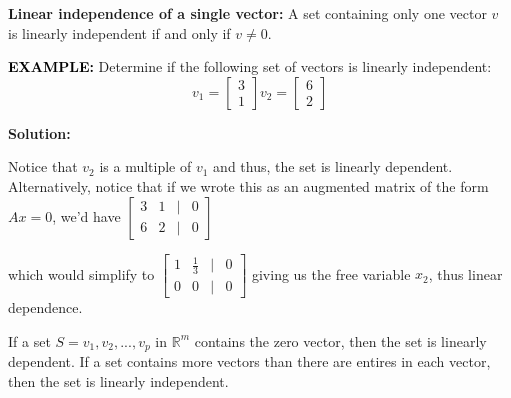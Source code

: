 \documentclass[12pt]{article}
\newcommand{\solution}{\noindent\textbf{Solution:}\par\nopagebreak}
\newcommand{\example}[1]{\noindent\textcolor{black}{\textbf{EXAMPLE:}} #1 \par}
\newcommand{\definition}[2]{
  \noindent\textbf{#1:} #2
}
\begin{document}
\definition{Linear independence of a single vector}{
    A set containing only one vector $v$ is linearly independent if and only if $v \neq 0$.
}

\example{
    Determine if the following set of vectors is linearly independent:
    \[
        v_1 = \begin{bmatrix}
            3\\1
        \end{bmatrix}
        v_2 = \begin{bmatrix}
            6\\2
        \end{bmatrix}
    \]
}
\solution
Notice that $v_2$ is a multiple of $v_1$ and thus, the set is linearly dependent.
\newline
\newline
Alternatively, notice that if we wrote this as an augmented matrix of the form $Ax=0$, we'd have $
\begin{bmatrix}
    3 & 1 & \vert & 0\\
    6 & 2 & \vert & 0
\end{bmatrix}$

which would simplify to $\begin{bmatrix}
    1 & \frac{1}{3} & \vert & 0\\
    0 & 0 & \vert & 0
\end{bmatrix}$
giving us the free variable $x_2$, thus linear dependence.

\begin{note}
    If a set $S={v_1,v_2, ... ,v_p}$ in $\mathbb{R}^m$ contains the zero vector, then the set is linearly dependent.
    \newline
    \newline
    If a set contains more vectors than there are entires in each vector, then the set is linearly independent.
\end{note}
\end{document}
